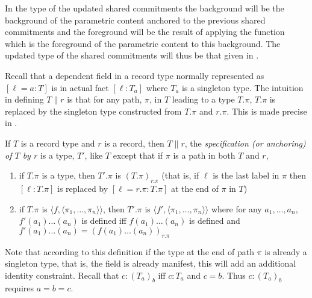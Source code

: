 In the type of the updated shared
commitments the background will be the background of the parametric
content anchored to the previous shared commitments and the foreground
will be the result of applying the function which is the foreground of
the parametric content to this background.
The updated type of the shared commitments
will thus be that given in \nexteg{}.   
\begin{ex} 
         \end{ex}



\begin{shaded}
  Recall that a dependent field in a record type normally represented
  as $[\ell=a:T]$ is in actual fact $[\ell:T_a]$ where $T_a$ is a
  singleton type.  The intuition in defining $T\parallel r$ is 
  that for any path, $\pi$, in $T$ leading to a type $T.\pi$, $T.\pi$ is
  replaced by the singleton type constructed from $T.\pi$ and $r.\pi$.
  This is made precise in \nexteg{}.
  \begin{ex} 
  If $T$ is a record type and $r$ is a record, then $T\parallel r$,  the
\textit{specification (or anchoring) of $T$ by
$r$} is a type, $T'$, like $T$ except that if $\pi$ is a path in both
$T$ and $r$,  
\begin{enumerate}
\item  if
$T.\pi$ is a type, then $T'.\pi$ is $(T.\pi)_{r.\pi}$ (that is, if
$\ell$ is the last label in $\pi$ then $[\ell:T.\pi]$ is replaced by
$[\ell=r.\pi:T.\pi]$ at the end of $\pi$ in $T$)

\item if $T.\pi$ is $\langle f,\langle\pi_1,\ldots,\pi_n\rangle\rangle$, then
  $T'.\pi$ is $\langle f',\langle\pi_1,\ldots,\pi_n\rangle\rangle$ where for any
  $a_1,\ldots,a_n$, $f'(a_1)\ldots(a_n)$ is defined iff
  $f(a_1)\ldots(a_n)$ is defined and $f'(a_1)\ldots(a_n) =
  (f(a_1)\ldots(a_n))_{r.\pi}$
\end{enumerate}
\end{ex}
Note that according to this definition if the type at the end of path
$\pi$ is already a singleton type, that is, the field is already
manifest, this will add an additional identity constraint.  Recall
that $c:(T_a)_b$ iff $c:T_a$ and $c=b$.  Thus $c:(T_a)_b$ requires $a=b=c$.


\end{shaded}
